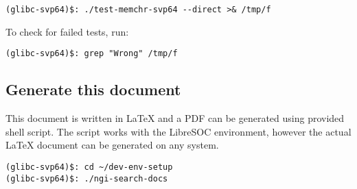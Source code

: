\begin{verbatim}
(glibc-svp64)$: ./test-memchr-svp64 --direct >& /tmp/f
\end{verbatim}

To check for failed tests, run:

\begin{verbatim}
(glibc-svp64)$: grep "Wrong" /tmp/f
\end{verbatim}

\subsection{Generate this document}

This document is written in \LaTeX{} and a PDF can be generated using provided
shell script. The script works with the LibreSOC environment, however the
actual \LaTeX{} document can be generated on any system.

\begin{verbatim}
(glibc-svp64)$: cd ~/dev-env-setup
(glibc-svp64)$: ./ngi-search-docs
\end{verbatim}
